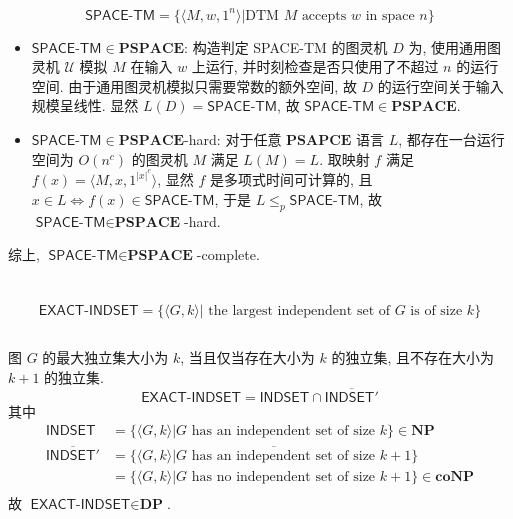 \documentclass[8pt]{article}
\theoremstyle{compact}
\def\le{\leqslant}
\begin{document}
\section{}
$$\textsf{SPACE-TM} = \{\langle M, w, 1^n \rangle | \text{DTM } M \text{ accepts } w \text{ in space } n\}$$
\begin{itemize}
	\item $\textsf{SPACE-TM} \in \mathbf{PSPACE}$: 构造判定 \textsf{SPACE-TM} 的图灵机 $D$ 为, 使用通用图灵机 $\mathcal U$ 模拟 $M$ 在输入 $w$ 上运行, 并时刻检查是否只使用了不超过 $n$ 的运行空间. 由于通用图灵机模拟只需要常数的额外空间, 故 $D$ 的运行空间关于输入规模呈线性. 显然 $L(D) = \textsf{SPACE-TM}$, 故 $\textsf{SPACE-TM} \in \mathbf{PSPACE}$.
	\item $\textsf{SPACE-TM} \in \mathbf{PSPACE}$-hard: 对于任意 $\textbf{PSAPCE}$ 语言 $L$, 都存在一台运行空间为 $O(n^c)$ 的图灵机 $M$ 满足 $L(M) = L$. 取映射 $f$ 满足 $f(x) = \langle M, x, 1^{|x|^c} \rangle$, 显然 $f$ 是多项式时间可计算的, 且 $x \in L \Leftrightarrow f(x) \in \textsf{SPACE-TM}$, 于是 $L \le_p \textsf{SPACE-TM}$, 故 $\textsf{SPACE-TM} \in \textbf{PSPACE}$-hard.
\end{itemize}

综上, $\textsf{SPACE-TM} \in \textbf{PSPACE}$-complete.

\section{}
$$\textsf{EXACT-INDSET} = \{\langle G, k \rangle | \text{ the largest independent set of } G \text{ is of size } k\}$$
\subsection{}
图 $G$ 的最大独立集大小为 $k$, 当且仅当存在大小为 $k$ 的独立集, 且不存在大小为 $k + 1$ 的独立集.
$$\textsf{EXACT-INDSET} = \textsf{INDSET} \cap \overline{\textsf{INDSET}'}$$
其中 \begin{equation*}
	\begin{split}
		\textsf{INDSET} &= \{\langle G, k \rangle | G \text{ has an independent set of size } k\} \in \textbf{NP} \\
		\overline{\textsf{INDSET}'} &= \overline{\{\langle G, k \rangle | G \text{ has an independent set of size } k + 1\}}\\
		&= \{\langle G, k \rangle | G \text{ has no independent set of size } k + 1\} \in \textbf{coNP} \\
	\end{split}
\end{equation*}
故 $\textsf{EXACT-INDSET} \in \textbf{DP}$.
\end{document}
